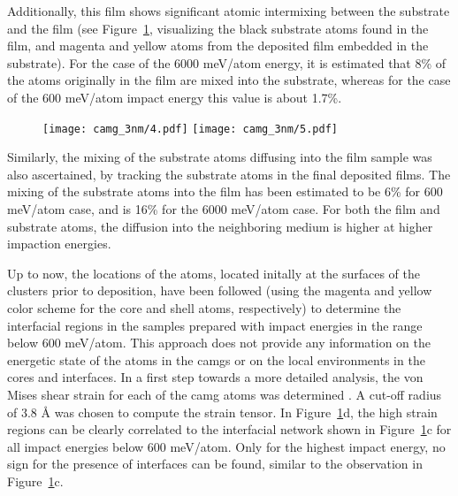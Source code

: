 \begin{changebar}
Additionally, this film shows significant atomic intermixing between the substrate and the film (see Figure~\ref{f:film_network}, visualizing the black substrate atoms found in the film, and magenta and yellow atoms from the deposited film embedded in the substrate). For the case of the 6000 meV/atom energy, it is estimated that 8\% of the atoms originally in the film are mixed into the substrate, whereas for the case of the 600 meV/atom impact energy this value is about 1.7\%. \par

\begin{figure}[!h]	\centering
	\texttt{[image: camg\_3nm/4.pdf]}
	\texttt{[image: camg\_3nm/5.pdf]}
	\label{f:film_network}
\end{figure}

Similarly, the mixing of the substrate atoms diffusing into the film sample was also ascertained, by tracking the substrate atoms in the final deposited films. The mixing of the substrate atoms into the film has been estimated to be 6\% for 600 meV/atom case, and is 16\% for the 6000 meV/atom case. For both the film and substrate atoms, the diffusion into the neighboring medium is higher at higher impaction energies. \par

Up to now, the locations of the atoms, located initally at the surfaces of the clusters prior to deposition, have been followed (using the magenta and yellow color scheme for the core and shell atoms, respectively) to determine the interfacial regions in the samples prepared with impact energies in the range below 600 meV/atom. This approach does not provide any information on the energetic state of the atoms in the \gls{camg}s or on the local environments in the cores and interfaces. In a first step towards a more detailed analysis, the von Mises shear strain for each of the \gls{camg} atoms was determined \cite{Stukowski2014}. A cut-off radius of 3.8 \r{A} was chosen to compute the strain tensor. In Figure~\ref{f:film_network}d, the high strain regions can be clearly correlated to the interfacial network shown in Figure~\ref{f:film_network}c for all impact energies below 600 meV/atom. Only for the highest impact energy, no sign for the presence of interfaces can be found, similar to the observation in Figure~\ref{f:film_network}c.  \par


\end{changebar}
